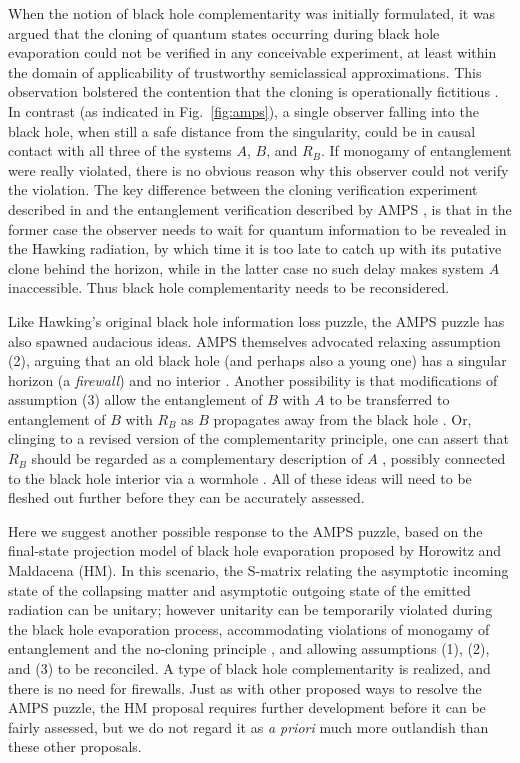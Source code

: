 \documentclass[11pt]{article}
\begin{document}
When the notion of black hole complementarity was initially formulated, it was argued that the cloning of quantum states occurring during black hole evaporation could not be verified in any conceivable experiment, at least within the domain of applicability of trustworthy semiclassical approximations. This observation bolstered the contention that the cloning is operationally fictitious \cite{complement2,preskill,hayden}. In contrast (as indicated in Fig.~\ref{fig:amps}), a single observer falling into the black hole, when still a safe distance from the singularity, could be in causal contact with all three of the systems $A$, $B$, and $R_B$. If monogamy of entanglement were really violated, there is no obvious reason why this observer could not verify the violation. The key difference between the cloning verification experiment described in  \cite{complement2,preskill,hayden} and the entanglement verification described by AMPS \cite{amps}, is that in the former case the observer needs to wait for quantum information to be revealed in the Hawking radiation, by which time it is too late to catch up with its putative clone behind the horizon, while in the latter case no such delay makes system $A$ inaccessible. Thus black hole complementarity needs to be reconsidered.

Like Hawking's original black hole information loss puzzle, the AMPS puzzle has also spawned audacious ideas. AMPS themselves advocated relaxing assumption (2), arguing that an old black hole (and perhaps also a young one) has a singular horizon (a {\em firewall}) and no interior \cite{amps,ampss}. Another possibility is that modifications of assumption (3) allow the entanglement of $B$ with $A$ to be transferred to entanglement of $B$ with $R_B$ as $B$ propagates away from the black hole \cite{giddings}. Or, clinging to a revised version of the complementarity principle, one can assert that $R_B$ should be regarded as a complementary description of $A$ \cite{raju,verlinde}, possibly connected to the black hole interior via a wormhole \cite{maldacena}. All of these ideas will need to be fleshed out further before they can be accurately assessed.

Here we suggest another possible response to the AMPS puzzle, based on the final-state projection model of black hole evaporation proposed \cite{horowitz} by Horowitz and Maldacena (HM). In this scenario, the S-matrix relating the asymptotic incoming state of the collapsing matter and asymptotic outgoing state of the emitted radiation can be unitary; however unitarity can be temporarily violated during the black hole evaporation process, accommodating violations of monogamy of entanglement and the no-cloning principle \cite{wootters,dieks}, and allowing assumptions (1), (2), and (3) to be reconciled. A type of black hole complementarity is realized, and there is no need for firewalls. Just as with other proposed ways to resolve the AMPS puzzle, the HM proposal requires further development before it can be fairly assessed, but we do not regard it as {\em a priori} much more outlandish than these other proposals.
\end{document}
